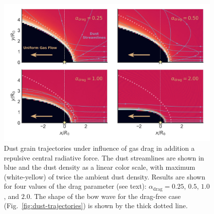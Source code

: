 \begin{figure}
  \centering
  \includegraphics[width=\linewidth]{figs/dust-couple-stream-annotate}
  \caption{Dust grain trajectories under influence of gas drag in
    addition a repulsive central radiative force.  The dust
    streamlines are shown in blue and the dust density as a linear
    color scale, with maximum (white-yellow) of twice the ambient dust
    density.  Results are shown for four values of the drag parameter
    (see text): \(\alpha_\text{drag} = 0.25\), \(0.5\), \(1.0\), and
    \(2.0\). The shape of the bow wave for the drag-free case
    (Fig.~\ref{fig:dust-trajectories}) is shown by the thick dotted
    line.}
  \label{fig:dust-wave-coupling}
\end{figure}

